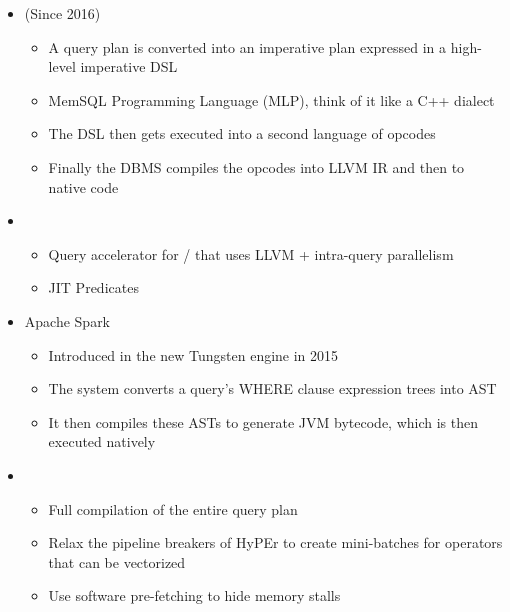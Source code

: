\documentclass[11pt]{article}
\begin{document}
\begin{itemize}
    \item {} (Since 2016)
    \begin{itemize}
        \item A query plan is converted into an imperative plan expressed in a high-level imperative DSL
        \item MemSQL Programming Language (MLP), think of it like a C++ dialect
        \item The DSL then gets executed into a second language of opcodes
        \item Finally the DBMS compiles the opcodes into LLVM IR and then to native code
    \end{itemize}
    \item {}
    \begin{itemize}
        \item Query accelerator for / that uses LLVM + intra-query 
parallelism
        \item JIT Predicates
    \end{itemize}
    \item Apache Spark
    \begin{itemize}
        \item Introduced in the new Tungsten engine in 2015
        \item The system converts a query's WHERE clause expression trees into AST
        \item It then compiles these ASTs to generate JVM bytecode, which is then executed natively
    \end{itemize}
    \item {}
    \begin{itemize}
        \item Full compilation of the entire query plan
        \item Relax the pipeline breakers of HyPEr to create mini-batches for operators that can be vectorized
        \item Use software pre-fetching to hide memory stalls
    \end{itemize}
\end{itemize}


\newpage


\end{document}
